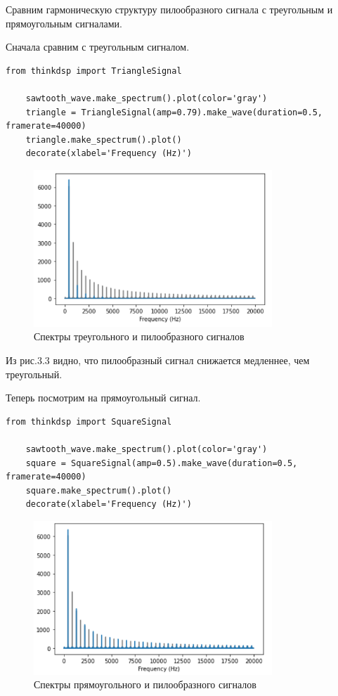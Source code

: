 \documentclass[a4paper,12pt]{report}
\begin{document}
    Сравним гармоническую структуру пилообразного сигнала с треугольным и прямоугольным сигналами.
    
    Сначала сравним с треугольным сигналом.
\begin{lstlisting}[caption=Сравнение с треугольным сигналосм]
    from thinkdsp import TriangleSignal

    sawtooth_wave.make_spectrum().plot(color='gray')
    triangle = TriangleSignal(amp=0.79).make_wave(duration=0.5, framerate=40000)
    triangle.make_spectrum().plot()
    decorate(xlabel='Frequency (Hz)')
\end{lstlisting}

\begin{figure}[H]
        \centering
        \includegraphics[width=0.8\textwidth]{fig3-3.PNG}
        \caption{Спектры треугольного и пилообразного сигналов}
        \label{fig:fig3-3}
\end{figure}

    Из рис.3.3 видно, что пилообразный сигнал снижается медленнее, чем треугольный.
    
    Теперь посмотрим на прямоугольный сигнал.
\begin{lstlisting}[caption=Сравнение с прямоугольным сигналосм]
    from thinkdsp import SquareSignal

    sawtooth_wave.make_spectrum().plot(color='gray')
    square = SquareSignal(amp=0.5).make_wave(duration=0.5, framerate=40000)
    square.make_spectrum().plot()
    decorate(xlabel='Frequency (Hz)')
\end{lstlisting}

\begin{figure}[H]
        \centering
        \includegraphics[width=0.8\textwidth]{fig3-4.PNG}
        \caption{Спектры прямоугольного и пилообразного сигналов}
        \label{fig:fig3-4}
\end{figure}    
    
\end{document}
